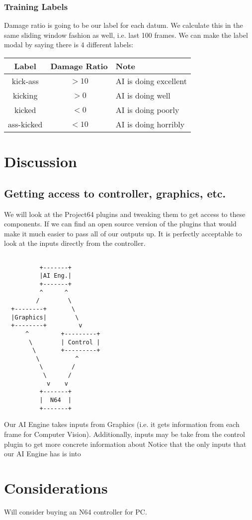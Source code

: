 \documentclass[12pt]{article}
\begin{document}
\subsubsection{Training Labels}
Damage ratio is going to be our label for each datum.
We calculate this in the same sliding window fashion as well, i.e. last 100 frames. 
We can make the label modal by saying there is 4 different labels:
\begin{tabular}{|c|c|l|}
Label & Damage Ratio & Note \\\hline
kick-ass & $>10$ & AI is doing excellent \\
kicking & $>0$ & AI is doing well \\
kicked & $<0$ & AI is doing poorly  \\
ass-kicked & $<10$ & AI is doing horribly 
\end{tabular}

\section{Discussion}
\subsection{Getting access to controller, graphics, etc.}
We will look at the Project64 plugins and tweaking them to get access to these components.
If we can find an open source version of the plugins that would make it much easier to pass all of our outputs up.
It is perfectly acceptable to look at the inputs directly from the controller.

\begin{verbatim}

          +-------+
          |AI Eng.| 
          +-------+
          ^      ^
         /        \
  +--------+       \
  |Graphics|        \
  +--------+         v
      ^         +---------+   
       \        | Control | 
        \       +---------+
         \          ^
          \        /
           \      /
            v    v
          +-------+
          |  N64  | 
          +-------+
\end{verbatim}
Our AI Engine takes inputs from Graphics (i.e. it gets information from each frame for Computer Vision).
Additionally, inputs may be take from the control plugin to get more concrete information about 
Notice that the only inputs that our AI Engine has is into 


\section{Considerations}
Will consider buying an N64 controller for PC.
\end{document}
